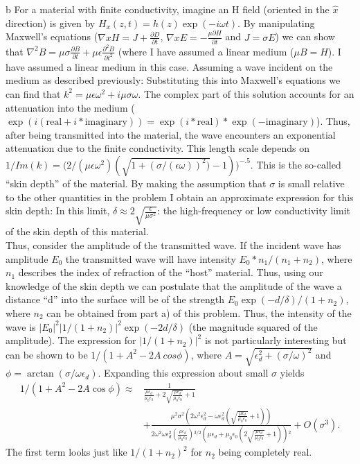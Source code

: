\begin{homeworkProblem}
\begin{homeworkSection}{b}
For a material with finite conductivity, imagine an H field (oriented in the $\hat{x}$ direction) is given by $H_x(z,t) = h(z)\exp(-i\omega t)$. By manipulating Maxwell's equations ($\nabla x H = J + \frac{\partial D}{\partial t}$, $\nabla x E = -\frac{\mu\partial H}{\partial t}$ and $J = \sigma E$) we can show that $\nabla^2 B = \mu\sigma \frac{\partial{B}}{\partial{t}}+\mu\epsilon\frac{\partial^2B}{\partial t^2}$ (where I have assumed a linear medium ($\mu B = H$). I have assumed a linear medium in this case. Assuming a wave incident on the medium as described previously: Substituting this into Maxwell's equations we can find that $k^2 = \mu \epsilon \omega^2 + i\mu\sigma \omega$. The complex part of this solution accounts for an attenuation into the medium ($\exp(i(\text{real}+i*\text{imaginary})) = \exp(i*\text{real})*\exp(-\text{imaginary})$). Thus, after being transmitted into the material, the wave encounters an exponential attenuation due to the finite conductivity. This length scale depends on $1/Im(k) = \Big( 2/(\mu\epsilon\omega^2)(\sqrt{1+(\sigma/(\epsilon\omega))^2)}-1)\Big)^{-.5}$. This is the so-called ``skin depth'' of the material. By making the assumption that $\sigma$ is small relative to the other quantities in the problem I obtain an approximate expression for this skin depth: In this limit, $\delta \approx 2\sqrt{\frac{\epsilon}{\mu\sigma^2}}$: the high-frequency or low conductivity limit of the skin depth of this material.
\\

Thus, consider the amplitude of the transmitted wave. If the incident wave has amplitude $E_0$ the transmitted wave will have intensity $E_0*n_1/(n_1+n_2)$, where $n_1$ describes the index of refraction of the ``host'' material. Thus, using our knowledge of the skin depth we can postulate that the amplitude of the wave a distance ``d'' into the surface will be of the strength $E_0\exp(-d/\delta)/(1+n_2)$, where $n_2$ can be obtained from part a) of this problem. Thus, the intensity of the wave is $|E_0|^2 |1/(1+n_2)|^2 \exp(-2d/\delta)$ (the magnitude squared of the amplitude). The expression for $|1/(1+n_2)|^2$ is not particularly interesting but can be shown to be $1/(1+A^2-2A\ cos\phi)$, where $ A = \sqrt{\epsilon_{d}^2+(\sigma/\omega)^2}$ and $\phi = \arctan(\sigma/\omega \epsilon_{d})$. Expanding this expression about small $\sigma$ yields 
\begin{align*}
1/(1+A^2-2A\cos\phi) \approx & \frac{1}{\frac{\mu  \epsilon_{d}}{\mu _0 \epsilon _0}+2 \sqrt{\frac{\mu  \epsilon_{d}}{\mu _0 \epsilon _0}}+1} \\ &+\frac{\mu ^2
   \sigma ^2 \left(2 \omega ^2 \epsilon_{d}^2-\omega \epsilon_{d}^2 \left(\sqrt{\frac{\mu  \epsilon_{d}}{\mu _0 \epsilon
   _0}}+1\right)\right)}{2 \omega ^2 \omega \epsilon_{d}^2 \left(\frac{\mu  \epsilon_{d}}{\mu _0 \epsilon
   _0}\right){}^{3/2} \left(\mu  \epsilon_{d}+\mu _0 \epsilon _0 \left(2 \sqrt{\frac{\mu  \epsilon_{d}}{\mu _0 \epsilon
   _0}}+1\right)\right){}^2}+O\left(\sigma ^3\right) . 
\end{align*}
	The first term looks just like $1/(1+n_2)^2$ for $n_2$ being completely real. 
	\\
	

\end{homeworkSection}
\end{homeworkProblem}
